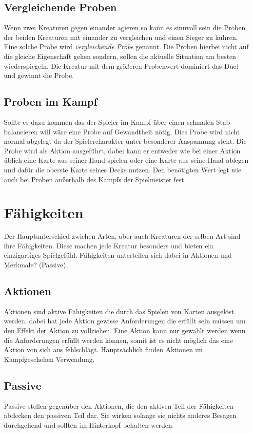 \subsection*{Vergleichende Proben}
Wenn zwei Kreaturen gegen einander agieren so kann es sinnvoll sein die Proben der beiden Kreaturen mit einander zu vergleichen und einen Sieger zu kühren. Eine solche Probe wird \textit{vergleichende Probe} genannt. Die Proben hierbei nicht auf die gleiche Eigenschaft gehen sondern, sollen die aktuelle Situation am besten wiederspiegeln. Die Kreatur mit dem größeren Probenwert dominiert das Duel und gewinnt die Probe.

\subsection*{Proben im Kampf}
Sollte es dazu kommen das der Spieler im Kampf über einen schmalen Stab balancieren will wäre eine Probe auf Gewandtheit nötig. Dies Probe wird nicht normal abgelegt da der Spielercharakter unter besonderer Anspannung steht.
Die Probe wird als Aktion ausgeführt, dabei kann er entweder wie bei einer Aktion üblich eine Karte aus seiner Hand spielen oder eine Karte aus seine Hand ablegen und dafür die oberste Karte seines Decks nutzen. Den benötigten Wert legt wie auch bei Proben außerhalb des Kampfs der Spielmeister fest.


\section{Fähigkeiten}
Der Hauptunterschied zwichen Arten, aber auch Kreaturen der selben Art sind ihre Fähigkeiten. Diese machen jede Kreatur besonders und bieten ein einzigartiges Spielgefühl.
Fähigkeiten unterteilen sich dabei in Aktionen und Merkmale? (Passive).

\subsection*{Aktionen}
Aktionen sind aktive Fähigkeiten die durch das Spielen von Karten ausgelöst werden, dabei hat jede Aktion gewisse Anforderungen die erfüllt sein müssen um den Effekt der Aktion zu vollziehen. Eine Aktion kann nur gewählt werden wenn die Anforderungen erfüllt werden können, somit ist es nicht möglich das eine Aktion von sich aus fehlschlägt. Hauptsächlich finden Aktionen im Kampfgeschehen Verwendung. 

\subsection*{Passive}
Passive stellen gegenüber den Aktionen, die den aktiven Teil der Fähigkeiten abdecken den passiven Teil dar. Sie wirken solange sie nichts anderes Besagen durchgehend und sollten im Hinterkopf behalten werden. 



